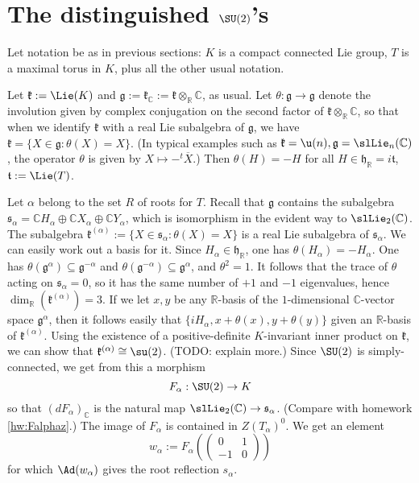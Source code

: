 \documentclass[reqno]{amsart} 
\begin{document}
\section{The distinguished \(\SU(2)\)'s\label{sec:distinguished-su2}}
\label{sec:org25cd375}
Let notation be as in previous sections: $K$ is a compact connected Lie group, $T$ is a maximal torus in $K$, plus all the other usual notation.

Let $\mathfrak{k} := \Lie(K)$ and $\mathfrak{g} := \mathfrak{k}_\mathbb{C} := \mathfrak{k} \otimes _{\mathbb{R}} \mathbb{C}$, as usual.  Let $\theta : \mathfrak{g} \rightarrow \mathfrak{g}$ denote the involution given by complex conjugation on the second factor of $\mathfrak{k} \otimes_{\mathbb{R}} \mathbb{C}$, so that when we identify $\mathfrak{k}$ with a real Lie subalgebra of $\mathfrak{g}$, we have $\mathfrak{k} = \{X \in \mathfrak{g} : \theta(X) = X\}$.  (In typical examples such as $\mathfrak{k} = \u(n), \mathfrak{g} = \slLie_n(\mathbb{C})$, the operator $\theta$ is given by $X \mapsto -{}^t \overline{X}$.)  Then $\theta(H) = - H$ for all $H \in \mathfrak{h}_\mathbb{R} = i \mathfrak{t}$, $\mathfrak{t} := \Lie(T)$.

Let $\alpha$ belong to the set $R$ of roots for $T$.  Recall that $\mathfrak{g}$ contains the subalgebra $\mathfrak{s}_\alpha = \mathbb{C} H_\alpha \oplus \mathbb{C} X_\alpha \oplus \mathbb{C} Y_\alpha$, which is isomorphism in the evident way to $\slLie_2(\mathbb{C})$.  The subalgebra $\mathfrak{k}^{(\alpha)} := \{X \in \mathfrak{s}_\alpha : \theta(X) = X\}$ is a real Lie subalgebra of $\mathfrak{s}_\alpha$.  We can easily work out a basis for it.  Since $H_\alpha \in \mathfrak{h}_\mathbb{R}$, one has $\theta(H_\alpha) = - H_\alpha$.  One has $\theta (\mathfrak{g}^\alpha) \subseteq \mathfrak{g}^{-\alpha}$ and $\theta (\mathfrak{g}^{-\alpha}) \subseteq \mathfrak{g}^{\alpha}$, and $\theta^2 = 1$.  It follows that the trace of $\theta$ acting on $\mathfrak{s}_\alpha = 0$, so it has the same number of $+1$ and $-1$ eigenvalues, hence $\dim_{\mathbb{R}}(\mathfrak{k}^{(\alpha)}) = 3$.  If we let $x,y$ be any $\mathbb{R}$-basis of the $1$-dimensional $\mathbb{C}$-vector space $\mathfrak{g}^\alpha$, then it follows easily that $\{i H_\alpha, x + \theta(x), y + \theta(y)\}$ given an $\mathbb{R}$-basis of $\mathfrak{k}^{(\alpha)}$.  Using the existence of a positive-definite $K$-invariant inner product on $\mathfrak{k}$, we can show that $\mathfrak{k}^{(\alpha)} \cong \su(2)$.  (TODO: explain more.)  Since $\SU(2)$ is simply-connected, we get from this a morphism
\begin{equation*}
  F_\alpha : \SU(2) \rightarrow K
\end{equation*}
so that $(d F_\alpha)_\mathbb{C}$ is the natural map $\slLie_2(\mathbb{C}) \rightarrow \mathfrak{s}_\alpha$.  (Compare with homework \ref{hw:Falphaz}.)  The image of $F_\alpha$ is contained in $Z(T_\alpha)^0$.  We get an element
\begin{equation*}
  w_\alpha := F_\alpha (
\begin{pmatrix}
    0 & 1 \\
    -1 & 0
  \end{pmatrix}
  )
\end{equation*}
for which $\Ad(w_\alpha)$ gives the root reflection $s_\alpha$.
\end{document}
